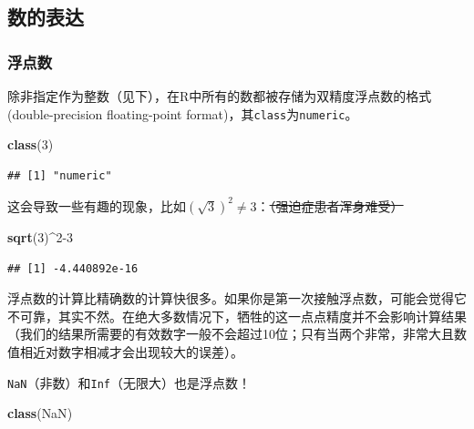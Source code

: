 \documentclass[]{book}
\newenvironment{Shaded}{\begin{snugshade}}{\end{snugshade}}
\newcommand{\DecValTok}[1]{\textcolor[rgb]{0.00,0.00,0.81}{#1}}
\newcommand{\KeywordTok}[1]{\textcolor[rgb]{0.13,0.29,0.53}{\textbf{#1}}}
\newcommand{\NormalTok}[1]{#1}
\newcommand{\OperatorTok}[1]{\textcolor[rgb]{0.81,0.36,0.00}{\textbf{#1}}}
\newcommand{\OtherTok}[1]{\textcolor[rgb]{0.56,0.35,0.01}{#1}}
\begin{document}
\hypertarget{math-notation}{%
\subsection{数的表达}\label{math-notation}}

\hypertarget{math-double-nums}{%
\subsubsection{浮点数}\label{math-double-nums}}

除非指定作为整数（见下），在R中所有的数都被存储为双精度浮点数的格式 (double-precision floating-point format)，其\texttt{class}为\texttt{numeric}。

\begin{Shaded}
\begin{Highlighting}[]
\KeywordTok{class}\NormalTok{(}\DecValTok{3}\NormalTok{)}
\end{Highlighting}
\end{Shaded}

\begin{verbatim}
## [1] "numeric"
\end{verbatim}

这会导致一些有趣的现象，比如\((\sqrt{3})^2 \neq 3\)：\sout{（强迫症患者浑身难受）}

\begin{Shaded}
\begin{Highlighting}[]
\KeywordTok{sqrt}\NormalTok{(}\DecValTok{3}\NormalTok{)}\OperatorTok{^}\DecValTok{2-3}
\end{Highlighting}
\end{Shaded}

\begin{verbatim}
## [1] -4.440892e-16
\end{verbatim}

浮点数的计算比精确数的计算快很多。如果你是第一次接触浮点数，可能会觉得它不可靠，其实不然。在绝大多数情况下，牺牲的这一点点精度并不会影响计算结果（我们的结果所需要的有效数字一般不会超过10位；只有当两个非常，非常大且数值相近对数字相减才会出现较大的误差）。

\texttt{NaN}（非数）和\texttt{Inf}（无限大）也是浮点数！

\begin{Shaded}
\begin{Highlighting}[]
\KeywordTok{class}\NormalTok{(}\OtherTok{NaN}\NormalTok{)}
\end{Highlighting}
\end{Shaded}
\end{document}

